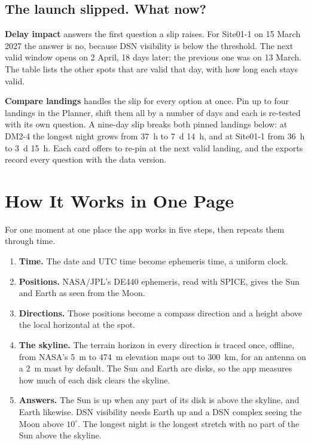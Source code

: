 \subsection{The launch slipped. What now?}
\textbf{Delay impact} answers the first question a slip raises. For Site01-1 on 15 March 2027 the answer is no, because DSN visibility is below the threshold. The next valid window opens on 2 April, 18 days later; the previous one was on 13 March. The table lists the other spots that are valid that day, with how long each stays valid.


\textbf{Compare landings} handles the slip for every option at once. Pin up to four landings in the Planner, shift them all by a number of days and each is re-tested with its own question. A nine-day slip breaks both pinned landings below: at DM2-4 the longest night grows from 37~h to 7~d 14~h, and at Site01-1 from 36~h to 3~d 15~h. Each card offers to re-pin at the next valid landing, and the exports record every question with the data version.


\section{How It Works in One Page}\label{sec:method}
For one moment at one place the app works in five steps, then repeats them through time.

\begin{enumerate}[label={\sffamily\bfseries\color{sun}\arabic*.},leftmargin=1.6em]
\item \textbf{Time.} The date and UTC time become ephemeris time, a uniform clock.
\item \textbf{Positions.} NASA/JPL's DE440 ephemeris, read with SPICE, gives the Sun and Earth as seen from the Moon.
\item \textbf{Directions.} Those positions become a compass direction and a height above the local horizontal at the spot.
\item \textbf{The skyline.} The terrain horizon in every direction is traced once, offline, from NASA's 5~m to 474~m elevation maps out to 300~km, for an antenna on a 2~m mast by default. The Sun and Earth are disks, so the app measures how much of each disk clears the skyline.
\item \textbf{Answers.} The Sun is up when any part of its disk is above the skyline, and Earth likewise. DSN visibility needs Earth up and a DSN complex seeing the Moon above $10^\circ$. The longest night is the longest stretch with no part of the Sun above the skyline.
\end{enumerate}

